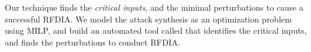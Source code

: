       \fi                                                    



Our technique finds the \textit{critical inputs}, and the minimal perturbations to cause a successful \ac{RFDIA}. We model the attack synthesis as an optimization problem using \ac{MILP}, and build an automated tool called \tool that identifies the critical inputs, and finds the perturbations to conduct \ac{RFDIA}. %




